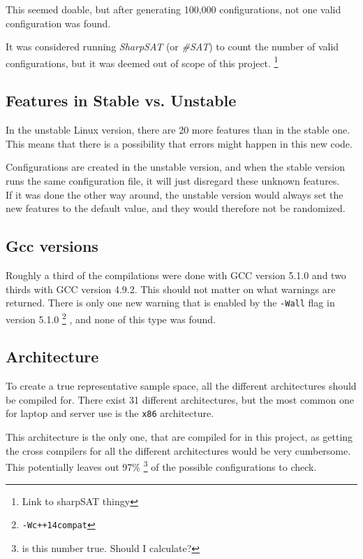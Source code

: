 \documentclass[a4paper,11pt]{report}
\begin{document}
This seemed doable, but after generating 100,000 configurations, not one 
valid configuration was found.

It was considered running \emph{SharpSAT} (or \emph{\#SAT}) to count the number
of valid configurations, but it was deemed out of scope of this project.
    \footnote{Link to sharpSAT thingy}


    \subsection{Features in Stable vs. Unstable}
In the unstable Linux version, there are 20 more features than in the stable 
one. This means that there is a possibility that errors might happen in this 
new code.

Configurations are created in the unstable version, and when the stable version 
runs the same configuration file, it will just disregard these unknown features.
\\

If it was done the other way around, the unstable version would always set the 
new features to the default value, and they would therefore not be randomized.


    \subsection{Gcc versions}
Roughly a third of the compilations were done with GCC version 5.1.0 and two 
thirds with GCC version 4.9.2. This should not matter on what warnings are 
returned. There is only one new warning that is enabled by the \texttt{-Wall} 
flag in version 5.1.0
    \footnote{\texttt{-Wc++14compat}}
, and none of this type was found.


    \subsection{Architecture}

To create a true representative sample space, all the different architectures 
should be compiled for. There exist 31 different architectures, but the most 
common one for laptop and server use is the \texttt{x86} architecture.

This architecture is the only one, that are compiled for in this project, as 
getting the cross compilers for all the different architectures would be very 
cumbersome. 
\\


This potentially leaves out 97\% \footnote{is this number true. Should I 
calculate?} of the possible configurations to check.
\end{document}
